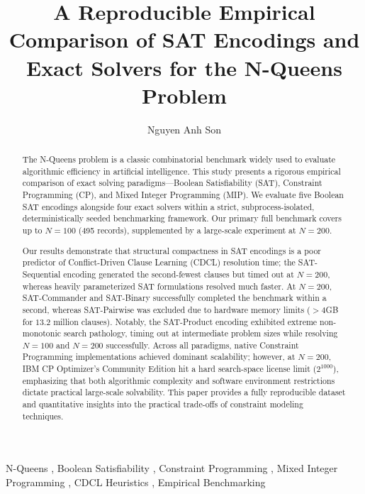 \documentclass[a4paper,fleqn]{cas-sc}
\begin{document}
\let\WriteBookmarks\relax
\def\floatpagepagefraction{1}
\def\textpagefraction{.001}


\title [mode = title]{A Reproducible Empirical Comparison of SAT Encodings and Exact Solvers for the N-Queens Problem}                      

\author[1]{Nguyen Anh Son}

\begin{abstract}
The N-Queens problem is a classic combinatorial benchmark widely used to evaluate algorithmic efficiency in artificial intelligence. This study presents a rigorous empirical comparison of exact solving paradigms---Boolean Satisfiability (SAT), Constraint Programming (CP), and Mixed Integer Programming (MIP). We evaluate five Boolean SAT encodings alongside four exact solvers within a strict, subprocess-isolated, deterministically seeded benchmarking framework. Our primary full benchmark covers up to $N=100$ (495 records), supplemented by a large-scale experiment at $N=200$. 

Our results demonstrate that structural compactness in SAT encodings is a poor predictor of Conflict-Driven Clause Learning (CDCL) resolution time; the SAT-Sequential encoding generated the second-fewest clauses but timed out at $N=200$, whereas heavily parameterized SAT formulations resolved much faster. At $N=200$, SAT-Commander and SAT-Binary successfully completed the benchmark within a second, whereas SAT-Pairwise was excluded due to hardware memory limits ($>4$GB for $13.2$ million clauses). Notably, the SAT-Product encoding exhibited extreme non-monotonic search pathology, timing out at intermediate problem sizes while resolving $N=100$ and $N=200$ successfully. Across all paradigms, native Constraint Programming implementations achieved dominant scalability; however, at $N=200$, IBM CP Optimizer's Community Edition hit a hard search-space license limit ($2^{1000}$), emphasizing that both algorithmic complexity and software environment restrictions dictate practical large-scale solvability. This paper provides a fully reproducible dataset and quantitative insights into the practical trade-offs of constraint modeling techniques.
\end{abstract}

\begin{keywords}
N-Queens \sep 
Boolean Satisfiability \sep 
Constraint Programming \sep 
Mixed Integer Programming \sep 
CDCL Heuristics \sep
Empirical Benchmarking
\end{keywords}
\end{document}
